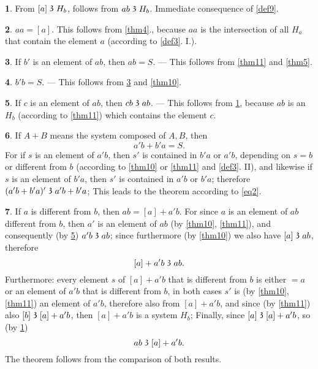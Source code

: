 \documentclass[leqno,hidelinks,a4paper]{article}
\theoremstyle{definition}
\newtheorem{satz}{\protect\satzname}
\newcommand{\satzname}{}
\renewcommand{\satzname}{\hspace{-4pt}.\ Satz}%
\renewcommand{\satzname}{\hspace{-4pt}.\ Theorem}%
\newcommand\partof{\mathrel{\raisebox{0.45ex}{$\mathfrak{3}$}}}
\begin{document}
\begin{satz}\label{thm12}
 From $[a] \partof H_b$, follows from $ab \partof H_b$.
Immediate consequence of \ref{def9}.
\end{satz}

\begin{satz}\label{thm13}
$aa = [a]$.
This follows from \ref{thm4}., because $aa$ is the intersection of all $H_a$ that contain the element $a$ (according to \ref{def3}. I.).
\end{satz}

\begin{satz}\label{thm14}
If $b'$ is an element of $ab$, then $ab = S$.
--- This follows from \ref{thm11} and \ref{thm5}.
\end{satz}


\begin{satz}\label{thm15}
 $b' b = S$.
 --- This follows from \ref{thm14} and \ref{thm10}.
\end{satz}

\begin{satz}\label{thm16}
If $c$ is an element of $ab$, then $cb \partof ab$.
--- This follows from \ref{thm12}, because $ab$ is an $H_b$ (according to \ref{thm11}) which contains the element $c$.
\end{satz}

\begin{satz}\label{thm17}
If $A + B$ means the system composed of $A, B$, then
\[
	a'b + b'a = S.
\]
For if $s$ is an element of $a'b$, then $s'$ is contained in $b'a$ or $a'b$, depending on $s = b$ or different from $b$ (according to \ref{thm10} or \ref{thm11} and \ref{def3}. II), and likewise if $s$ is an element of $b'a$, then $s'$ is contained in $a'b$ or $b'a$; therefore $(a'b + b'a)' \partof a'b + b'a$; This leads to the theorem according to \eqref{eq2}.
\end{satz}

\begin{satz}\label{thm18}
If $a$ is different from $b$, then $ab = [a] + a'b$.
For since $a$ is an element of $ab$ different from $b$, then $a'$ is an element of $ab$ (by \ref{thm10}, \ref{thm11}), and consequently (by \ref{thm16}) $a'b \partof ab$; since furthermore (by \ref{thm10}) we also have $[a] \partof ab$, therefore
\[
	[a] + a'b \partof ab.
\]
Furthermore: every element $s$ of $[a] + a'b$ that is different from $b$ is either $= a$ or an element of $a'b$ that is different from $b$, in both cases $s'$ is (by \ref{thm10}, \ref{thm11}) an element of $a'b$, therefore also from $[a]+ a'b$, and since (by \ref{thm11}) also $[b] \partof [a] + a'b$, then $[a] + a'b$ is a system $H_b$; Finally, since $[a] \partof [a] + a'b$, so (by \ref{thm12})
\[
	ab \partof [a] + a' b.
\]
The theorem follows from the comparison of both results.
\end{satz}
\end{document}
